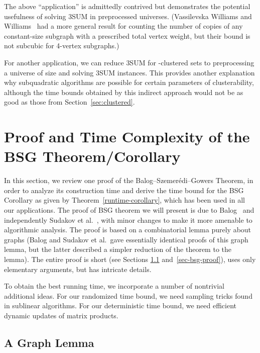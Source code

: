 \documentclass[11pt]{article}
\begin{document}
{The above ``application'' is admittedly contrived but demonstrates
the potential usefulness of solving 3SUM in preprocessed universes.
(Vassilevska Williams and Williams~\cite{VW09} had a more general
result for counting
the number of copies of any constant-size subgraph
with a prescribed total vertex weight, but their bound is not
subcubic for 4-vertex subgraphs.)

For another application, we can reduce 3SUM for -clustered
sets to preprocessing a universe of size 
and solving  3SUM instances.  This provides another
explanation why subquadratic algorithms are possible for certain
parameters of clusterability, although the time bounds obtained by
this indirect approach would not be as good as those from Section~\ref{sec:clustered}.

\section{Proof and Time Complexity of the BSG Theorem/Corollary}\label{sec:Details}

\newcommand{\Deg}{\textrm{deg}}
\newcommand{\cdeg}{\textrm{cdeg}}
\newcommand{\BAD}{\textsc{bad}}
\newcommand{\Ex}{\mathbb{E}}

In this section, we review one proof of the
Balog--Szemer\'{e}di--Gowers Theorem, in order to analyze its
construction time and derive the time bound for the BSG Corollary as given by Theorem~\ref{runtime-corollary}, which has been
used in all our applications.
The proof of BSG theorem we will present is due to
Balog~\cite{Balog07} and independently
 Sudakov et al.~\cite{SSV94}, with minor changes
to make it more amenable to algorithmic analysis.  The proof is
based on a combinatorial lemma purely about graphs (Balog and
Sudakov et al.\ gave essentially identical proofs of this
graph lemma, but the latter described a simpler reduction of the
theorem to the lemma).  The entire proof is short (see Sections \ref{sec-graph} and~\ref{sec-bsg-proof}), uses only
elementary arguments, but has intricate details.

To obtain the
best running time, we incorporate a number of
nontrivial additional ideas.  For our randomized time bound,
we need sampling tricks found in sublinear algorithms.
For our deterministic time bound, we need efficient dynamic updates
of matrix products.


\subsection{A Graph Lemma}\label{sec-graph}

}
\end{document}
